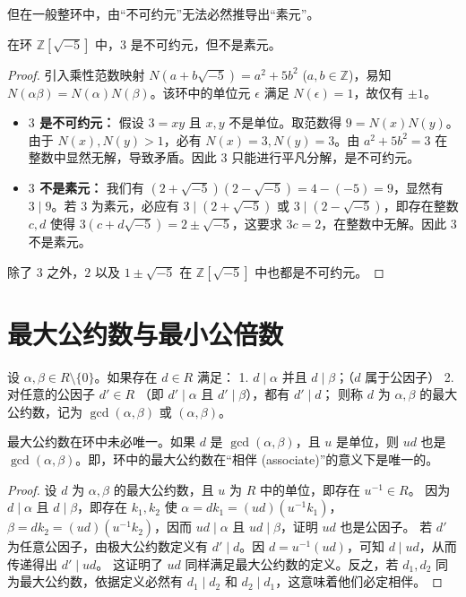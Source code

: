 \documentclass[11pt]{article}
\begin{document}
但在一般整环中，由“不可约元”无法必然推导出“素元”。
\begin{cnexample}
在环 $\mathbb{Z}[\sqrt{-5}]$ 中，$3$ 是不可约元，但不是素元。
\end{cnexample}
\begin{proof}
引入乘性范数映射 $N(a+b\sqrt{-5}) = a^2+5b^2$ ($a,b \in \mathbb{Z}$)，易知 $N(\alpha\beta) = N(\alpha)N(\beta)$。该环中的单位元 $\epsilon$ 满足 $N(\epsilon)=1$，故仅有 $\pm 1$。
\begin{itemize}
    \item \textbf{$3$ 是不可约元：} 假设 $3 = xy$ 且 $x,y$ 不是单位。取范数得 $9 = N(x)N(y)$。由于 $N(x), N(y) > 1$，必有 $N(x)=3, N(y)=3$。由 $a^2+5b^2=3$ 在整数中显然无解，导致矛盾。因此 $3$ 只能进行平凡分解，是不可约元。
    \item \textbf{$3$ 不是素元：} 我们有 $(2+\sqrt{-5})(2-\sqrt{-5}) = 4 - (-5) = 9$，显然有 $3 \mid 9$。若 $3$ 为素元，必应有 $3 \mid (2+\sqrt{-5})$ 或 $3 \mid (2-\sqrt{-5})$，即存在整数 $c,d$ 使得 $3(c+d\sqrt{-5}) = 2\pm \sqrt{-5}$，这要求 $3c = 2$，在整数中无解。因此 $3$ 不是素元。
\end{itemize}
除了 $3$ 之外，$2$ 以及 $1\pm \sqrt{-5}$ 在 $\mathbb{Z}[\sqrt{-5}]$ 中也都是不可约元。
\end{proof}

\section{最大公约数与最小公倍数}
\begin{cndefinition}
设 $\alpha, \beta \in R\setminus\{0\}$。如果存在 $d \in R$ 满足：
1. $d \mid \alpha$ 并且 $d \mid \beta$；（$d$ 属于公因子）
2. 对任意的公因子 $d' \in R$ （即 $d' \mid \alpha$ 且 $d' \mid \beta$），都有 $d' \mid d$；
则称 $d$ 为 $\alpha, \beta$ 的最大公约数，记为 $\gcd(\alpha, \beta)$ 或 $(\alpha, \beta)$。
\end{cndefinition}
\begin{cnproperty}
最大公约数在环中未必唯一。如果 $d$ 是 $\gcd(\alpha, \beta)$，且 $u$ 是单位，则 $ud$ 也是 $\gcd(\alpha, \beta)$。即，环中的最大公约数在“相伴 (associate)”的意义下是唯一的。
\end{cnproperty}
\begin{proof}
设 $d$ 为 $\alpha, \beta$ 的最大公约数，且 $u$ 为 $R$ 中的单位，即存在 $u^{-1} \in R$。
因为 $d \mid \alpha$ 且 $d \mid \beta$，即存在 $k_1, k_2$ 使 $\alpha = d k_1 = (ud)(u^{-1} k_1)$，$\beta = d k_2 = (ud)(u^{-1} k_2)$，因而 $ud \mid \alpha$ 且 $ud \mid \beta$，证明 $ud$ 也是公因子。
若 $d'$ 为任意公因子，由极大公约数定义有 $d' \mid d$。因 $d = u^{-1}(ud)$，可知 $d \mid ud$，从而传递得出 $d' \mid ud$。
这证明了 $ud$ 同样满足最大公约数的定义。反之，若 $d_1, d_2$ 同为最大公约数，依据定义必然有 $d_1 \mid d_2$ 和 $d_2 \mid d_1$，这意味着他们必定相伴。
\end{proof}
\end{document}
